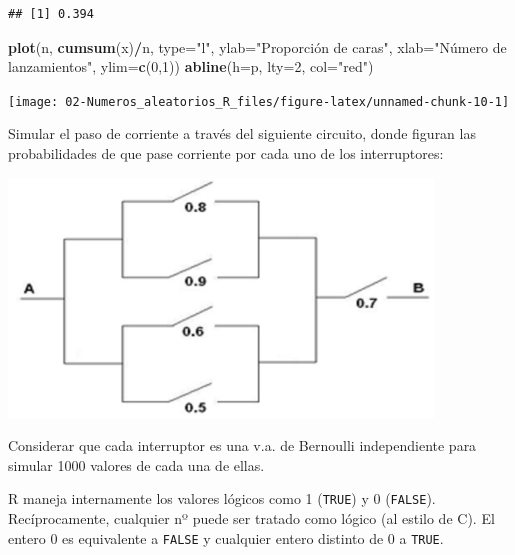 \documentclass[]{book}
\newenvironment{Shaded}{\begin{snugshade}}{\end{snugshade}}
\newcommand{\KeywordTok}[1]{\textcolor[rgb]{0.13,0.29,0.53}{\textbf{#1}}}
\newcommand{\DataTypeTok}[1]{\textcolor[rgb]{0.13,0.29,0.53}{#1}}
\newcommand{\DecValTok}[1]{\textcolor[rgb]{0.00,0.00,0.81}{#1}}
\newcommand{\StringTok}[1]{\textcolor[rgb]{0.31,0.60,0.02}{#1}}
\newcommand{\OperatorTok}[1]{\textcolor[rgb]{0.81,0.36,0.00}{\textbf{#1}}}
\newcommand{\NormalTok}[1]{#1}
\theoremstyle{definition}
\theoremstyle{definition}
\theoremstyle{definition}
\theoremstyle{remark}
\let\BeginKnitrBlock\begin \let\EndKnitrBlock\end
\begin{document}
\begin{enumerate}
\begin{verbatim}
## [1] 0.394
\end{verbatim}

\begin{Shaded}
\begin{Highlighting}[]
\KeywordTok{plot}\NormalTok{(n, }\KeywordTok{cumsum}\NormalTok{(x)}\OperatorTok{/}\NormalTok{n, }\DataTypeTok{type=}\StringTok{"l"}\NormalTok{, }\DataTypeTok{ylab=}\StringTok{"Proporción de caras"}\NormalTok{, }
     \DataTypeTok{xlab=}\StringTok{"Número de lanzamientos"}\NormalTok{, }\DataTypeTok{ylim=}\KeywordTok{c}\NormalTok{(}\DecValTok{0}\NormalTok{,}\DecValTok{1}\NormalTok{))}
\KeywordTok{abline}\NormalTok{(}\DataTypeTok{h=}\NormalTok{p, }\DataTypeTok{lty=}\DecValTok{2}\NormalTok{, }\DataTypeTok{col=}\StringTok{"red"}\NormalTok{)}
\end{Highlighting}
\end{Shaded}

  \begin{center}\texttt{[image: 02-Numeros\_aleatorios\_R\_files/figure-latex/unnamed-chunk-10-1]} \end{center}
\end{enumerate}

\BeginKnitrBlock{exercise}
\protect\hypertarget{exr:unnamed-chunk-11}{}{\label{exr:unnamed-chunk-11} }
\EndKnitrBlock{exercise} Simular el paso de corriente a través del
siguiente circuito, donde figuran las probabilidades de que pase
corriente por cada uno de los interruptores:

\begin{center}\includegraphics[width=0.7\linewidth]{images/circuito2} \end{center}

Considerar que cada interruptor es una v.a. de Bernoulli independiente
para simular 1000 valores de cada una de ellas.

\BeginKnitrBlock{remark}
{}R maneja internamente los valores lógicos como
1 (\texttt{TRUE}) y 0 (\texttt{FALSE}). Recíprocamente, cualquier nº
puede ser tratado como lógico (al estilo de C). El entero 0 es
equivalente a \texttt{FALSE} y cualquier entero distinto de 0 a
\texttt{TRUE}.
\EndKnitrBlock{remark}
\end{document}
